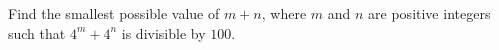 Find the smallest possible value of $m+n$, where $m$ and $n$ are positive integers such that $4^m+4^n$ is divisible by $100$.
